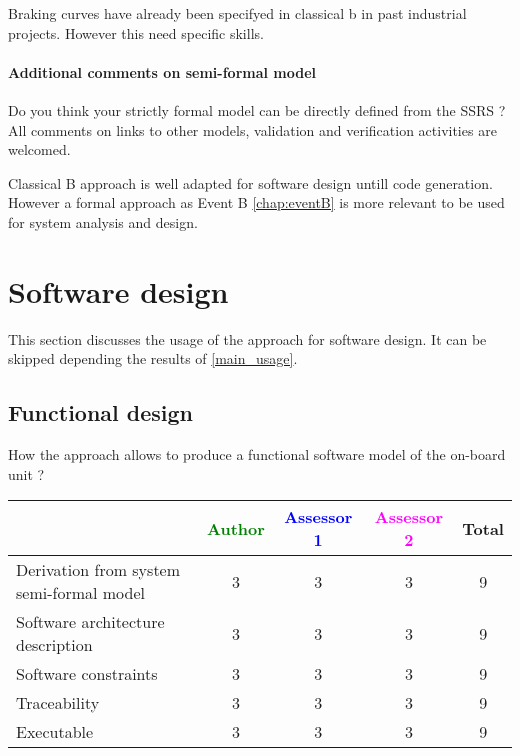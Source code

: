 \begin{author_comment}
Braking curves have already been specifyed in classical b  in past industrial projects. However this need specific skills.
\end{author_comment}


\paragraph{Additional comments on semi-formal  model} Do you think your strictly formal  model can be directly defined from the SSRS ?
All comments on links to  other models, validation and verification activities are welcomed.



\begin{author_comment}
Classical B  approach is well adapted for software design untill code generation. However a formal approach as Event B \ref{chap:eventB} is more relevant to be used for system analysis and design.
\end{author_comment}


\section{Software design}
This section discusses the usage of the approach for software design.
It can be skipped depending the results of \ref{main_usage}.

\subsection{Functional design}

How the approach allows to  produce a functional software model of the on-board unit ?

\begin{tabular}{|l | c | c | c | c|}
\hline
& \textcolor{green}{Author} & \textcolor{blue}{Assessor 1} & \textcolor{magenta}{Assessor 2} & Total \\
\hline
Derivation from system semi-formal model  & 3 & 3 & 3 & 9 \\
\hline 
Software architecture description  & 3 & 3 & 3 & 9 \\
\hline
Software constraints  & 3 & 3 & 3 & 9 \\
\hline
Traceability  & 3 & 3 & 3 & 9 \\
\hline
Executable  & 3  & 3 & 3 & 9 \\
\hline
\end{tabular}

